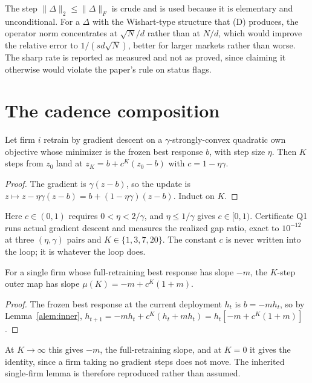 The step $\|\Delta\|_2 \leq \|\Delta\|_F$ is crude and is used because it is elementary and unconditional. For a $\Delta$ with the Wishart-type structure that (D) produces, the operator norm concentrates at $\sqrt{N}/d$ rather than at $N/d$, which would improve the relative error to $1/(sd\sqrt{N})$, better for larger markets rather than worse. The sharp rate is reported as measured and not as proved, since claiming it otherwise would violate the paper's rule on status flags.

\section{The cadence composition}
\label{app:cadence}

\begin{alemma}
\label{alem:inner}
Let firm $i$ retrain by gradient descent on a $\gamma$-strongly-convex quadratic own objective whose minimizer is the frozen best response $b$, with step size $\eta$. Then $K$ steps from $z_0$ land at $z_K = b + c^K(z_0-b)$ with $c = 1-\eta\gamma$.
\end{alemma}

\begin{proof}
The gradient is $\gamma(z-b)$, so the update is $z \mapsto z - \eta\gamma(z-b) = b + (1-\eta\gamma)(z-b)$. Induct on $K$.
\end{proof}

Here $c \in (0,1)$ requires $0 < \eta < 2/\gamma$, and $\eta \leq 1/\gamma$ gives $c \in [0,1)$. Certificate Q1 runs actual gradient descent and measures the realized gap ratio, exact to $10^{-12}$ at three $(\eta,\gamma)$ pairs and $K \in \{1,3,7,20\}$. The constant $c$ is never written into the loop; it is whatever the loop does.

\begin{alemma}
\label{alem:lazy}
For a single firm whose full-retraining best response has slope $-m$, the $K$-step outer map has slope $\mu(K) = -m + c^K(1+m)$.
\end{alemma}

\begin{proof}
The frozen best response at the current deployment $h_t$ is $b = -mh_t$, so by Lemma~\ref{alem:inner}, $h_{t+1} = -mh_t + c^K(h_t + mh_t) = h_t[-m + c^K(1+m)]$.
\end{proof}

At $K \to \infty$ this gives $-m$, the full-retraining slope, and at $K=0$ it gives the identity, since a firm taking no gradient steps does not move. The inherited single-firm lemma is therefore reproduced rather than assumed.

